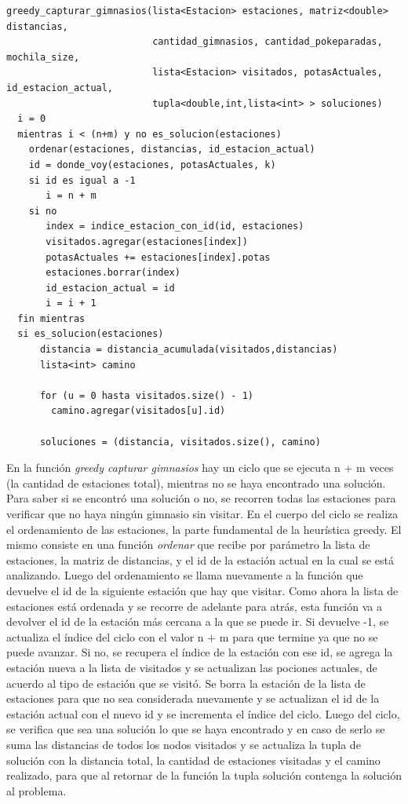             \begin{codesnippet}
            \begin{verbatim}
greedy_capturar_gimnasios(lista<Estacion> estaciones, matriz<double> distancias, 
                          cantidad_gimnasios, cantidad_pokeparadas, mochila_size, 
                          lista<Estacion> visitados, potasActuales, id_estacion_actual, 
                          tupla<double,int,lista<int> > soluciones)
  i = 0
  mientras i < (n+m) y no es_solucion(estaciones)
    ordenar(estaciones, distancias, id_estacion_actual)
    id = donde_voy(estaciones, potasActuales, k)
    si id es igual a -1
       i = n + m
    si no
       index = indice_estacion_con_id(id, estaciones)
       visitados.agregar(estaciones[index])
       potasActuales += estaciones[index].potas
       estaciones.borrar(index)
       id_estacion_actual = id
       i = i + 1
  fin mientras
  si es_solucion(estaciones)
      distancia = distancia_acumulada(visitados,distancias)
      lista<int> camino

      for (u = 0 hasta visitados.size() - 1)
        camino.agregar(visitados[u].id)

      soluciones = (distancia, visitados.size(), camino)

            \end{verbatim}
            \end{codesnippet}

En la función \textit{greedy capturar gimnasios} hay un ciclo que se ejecuta n + m veces (la cantidad de estaciones total), mientras no se haya encontrado una solución. Para saber si se encontró una solución o no, se recorren todas las estaciones para verificar que no haya ningún gimnasio sin visitar. En el cuerpo del ciclo se realiza el ordenamiento de las estaciones, la parte fundamental de la heurística greedy. El mismo consiste en una función \textit{ordenar} que recibe por parámetro la lista de estaciones, la matriz de distancias, y el id de la estación actual en la cual se está analizando.
Luego del ordenamiento se llama nuevamente a la función que devuelve el id de la siguiente estación que hay que visitar. Como ahora la lista de estaciones está ordenada y se recorre de adelante para atrás, esta función va a devolver el id de la estación más cercana a la que se puede ir. Si devuelve -1, se actualiza el índice del ciclo con el valor n + m para que termine ya que no se puede avanzar. Si no, se recupera el índice de la estación con ese id, se agrega la estación nueva a la lista de visitados y se actualizan las pociones actuales, de acuerdo al tipo de estación que se visitó. Se borra la estación de la lista de estaciones para que no sea considerada nuevamente y se actualizan el id de la estación actual con el nuevo id y se incrementa el índice del ciclo. Luego del ciclo, se verifica que sea una solución lo que se haya encontrado y en caso de serlo se suma las distancias de todos los nodos visitados y se actualiza la tupla de solución con la distancia total, la cantidad de estaciones visitadas y el camino realizado, para que al retornar de la función la tupla solución contenga la solución al problema. 

